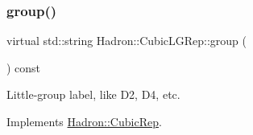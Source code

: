 \subsubsection{\texorpdfstring{group()}{group()}\hspace{0.1cm}{\footnotesize\ttfamily [3/3]}}
{\footnotesize\ttfamily virtual std\+::string Hadron\+::\+Cubic\+L\+G\+Rep\+::group (\begin{DoxyParamCaption}{ }\end{DoxyParamCaption}) const\hspace{0.3cm}{\ttfamily [pure virtual]}}

Little-\/group label, like D2, D4, etc. 

Implements \mbox{\hyperlink{structHadron_1_1CubicRep_a0748f11ec87f387062c8e8981339a29c}{Hadron\+::\+Cubic\+Rep}}.



